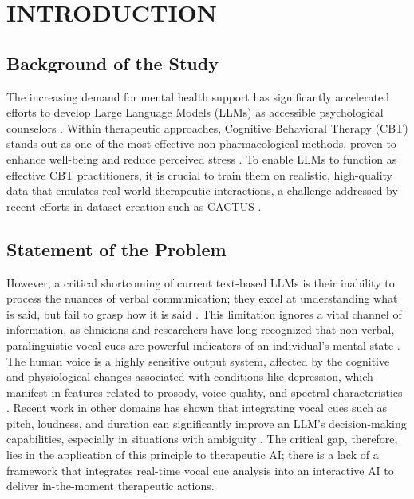 \chapter{INTRODUCTION} 

\section{Background of the Study}
The increasing demand for mental health support has significantly accelerated efforts to develop Large Language Models (LLMs) as accessible psychological counselors \cite{lee2024cactus}. Within therapeutic approaches, Cognitive Behavioral Therapy (CBT) stands out as one of the most effective non-pharmacological methods, proven to enhance well-being and reduce perceived stress \cite{shahrokhian2021effects}. To enable LLMs to function as effective CBT practitioners, it is crucial to train them on realistic, high-quality data that emulates real-world therapeutic interactions, a challenge addressed by recent efforts in dataset creation such as CACTUS \cite{lee2024cactus}.

\section{Statement of the Problem}
However, a critical shortcoming of current text-based LLMs is their inability to process the nuances of verbal communication; they excel at understanding what is said, but fail to grasp how it is said \cite{sun2024beyond}. This limitation ignores a vital channel of information, as clinicians and researchers have long recognized that non-verbal, paralinguistic vocal cues are powerful indicators of an individual's mental state \cite{cummins2015review}. The human voice is a highly sensitive output system, affected by the cognitive and physiological changes associated with conditions like depression, which manifest in features related to prosody, voice quality, and spectral characteristics \cite{cummins2015review}. Recent work in other domains has shown that integrating vocal cues such as pitch, loudness, and duration can significantly improve an LLM's decision-making capabilities, especially in situations with ambiguity \cite{sun2024beyond}. The critical gap, therefore, lies in the application of this principle to therapeutic AI; there is a lack of a framework that integrates real-time vocal cue analysis into an interactive AI to deliver in-the-moment therapeutic actions.


